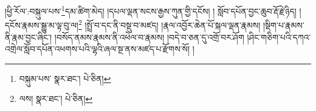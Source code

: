 །ཕྱི་རོལ་:བསྐུལ་པས་\footnote{བསྐུམ་པས་  སྣར་ཐང་།  པེ་ཅིན། }དམ་ཚིག་མེད། །དཔལ་ལྡན་སངས་རྒྱས་ཀུན་གྱི་དངོས། །
སློབ་དཔོན་བྱང་ཆུབ་རྡོ་རྗེ་ཉིད། །དངོས་རྣམས་སྒྱུ་མ་ལྟ་བུ་ལ།\footnote{ལས།  སྣར་ཐང་།  པེ་ཅིན། } །སྤྲོ་བ་དང་ནི་བསྡུ་བ་མཛད། །རྣལ་འབྱོར་ཆེན་པོ་སྐལ་ལྡན་རྣམས། །སྡིག་པ་རྣམས་ནི་རྣམ་བྱང་ཞིང་། །བསོད་ནམས་རྣམས་ནི་འཕེལ་བ་རྣམས། །བདེ་བ་ཅན་དུ་འགྲོ་བར་ཤོག །ཤིང་གཅིག་པའི་དཀའ་འགྲེལ་སློབ་དཔོན་འཕགས་པའི་ལྷའི་ཞལ་སྔ་ནས་མཛད་པ་རྫོགས་སོ། ། 